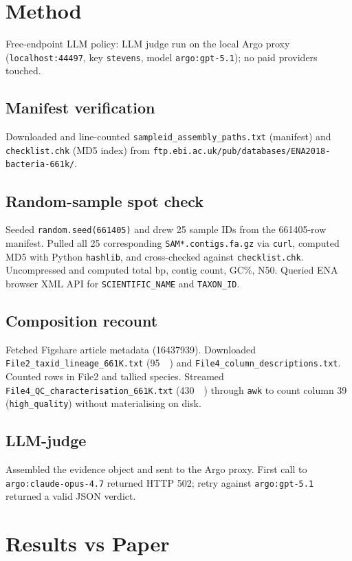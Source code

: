 \documentclass[11pt]{article}
\begin{document}
\section{Method}

Free-endpoint LLM policy: LLM judge run on the local Argo proxy
(\texttt{localhost:44497}, key \texttt{stevens}, model \texttt{argo:gpt-5.1}); no paid providers touched.

\subsection{Manifest verification}
Downloaded and line-counted \texttt{sampleid\_assembly\_paths.txt} (manifest) and
\texttt{checklist.chk} (MD5 index) from \texttt{ftp.ebi.ac.uk/pub/databases/ENA2018-bacteria-661k/}.

\subsection{Random-sample spot check}
Seeded \texttt{random.seed(661405)} and drew 25 sample IDs from the \num{661405}-row manifest.
Pulled all 25 corresponding \texttt{SAM*.contigs.fa.gz} via \texttt{curl}, computed MD5 with
Python \texttt{hashlib}, and cross-checked against \texttt{checklist.chk}. Uncompressed and
computed total bp, contig count, GC\%, N50. Queried ENA browser XML API for
\texttt{SCIENTIFIC\_NAME} and \texttt{TAXON\_ID}.

\subsection{Composition recount}
Fetched Figshare article metadata (16437939). Downloaded \texttt{File2\_taxid\_lineage\_661K.txt}
(\SI{95}{\mega\byte}) and \texttt{File4\_column\_descriptions.txt}. Counted rows in File2 and tallied
species. Streamed \texttt{File4\_QC\_characterisation\_661K.txt} (\SI{430}{\mega\byte}) through
\texttt{awk} to count column 39 (\texttt{high\_quality}) without materialising on disk.

\subsection{LLM-judge}
Assembled the evidence object and sent to the Argo proxy. First call to
\texttt{argo:claude-opus-4.7} returned HTTP 502; retry against \texttt{argo:gpt-5.1} returned a
valid JSON verdict.

\section{Results vs Paper}
\end{document}
